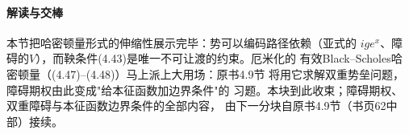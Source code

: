 \paragraph{解读与交棒}
本节把哈密顿量形式的伸缩性展示完毕：势可以编码路径依赖（亚式的
$ige^{x}$、障碍的$V$），而鞅条件(4.43)是唯一不可让渡的约束。厄米化的
有效Black--Scholes哈密顿量（(4.47)--(4.48)）马上派上大用场：原书4.9节
将用它求解双重势垒问题，障碍期权由此变成"给本征函数加边界条件"的
习题。本块到此收束；障碍期权、双重障碍与本征函数边界条件的全部内容，
由下一分块自原书4.9节（书页62中部）接续。


